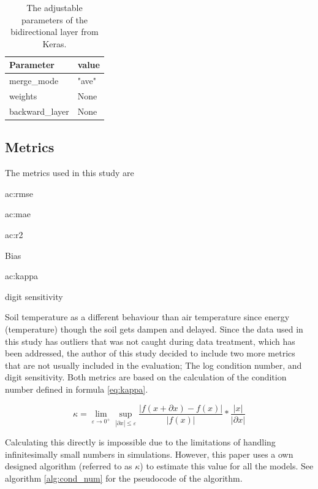 \begin{table}
	\centering
	\begin{tabular}{l|l}
		Parameter&value\\\hline
		merge\_mode&"ave"\\
		weights&None\\
		backward\_layer&None
	\end{tabular}
	\caption[Bidirectional method parameters]{The adjustable parameters of the bidirectional layer from Keras.}
	\label{tab:bidir:params}
\end{table}


\subsection{Metrics}\label{sec:method:metric}

The metrics used in this study are

\begin{itemize*}
	\item \acrfull{ac:rmse}
	\item \acrfull{ac:mae}
	\item \acrfull{ac:r2}
	\item Bias
	\item \acrfull{ac:kappa}
	\item digit sensitivity
\end{itemize*}

Soil temperature as a different behaviour than air temperature since energy (temperature) though the soil gets dampen and delayed. Since the data used in this study has outliers that was not caught during data treatment, which has been addressed, the author of this study decided to include two more metrics that are not usually included in the evaluation; The log condition number, and digit sensitivity. Both metrics are based on the calculation of the condition number defined in formula \ref{eq:kappa}.

\begin{equation}\label{eq:kappa}
\kappa = \lim\limits_{\varepsilon \to 0^+} \sup\limits_{|\partial x|\leq\varepsilon}  \frac{\left|f(x+\partial x) - f(x)\right|}{|f(x)|}*\frac{|x|}{|\partial x|} 
\end{equation}

Calculating this directly is impossible due to the limitations of handling infinitesimally small numbers in simulations. However, this paper uses a own designed algorithm (referred to as $\kappa$) to estimate this value for all the models. See algorithm \ref{alg:cond_num} for the pseudocode of the algorithm.

